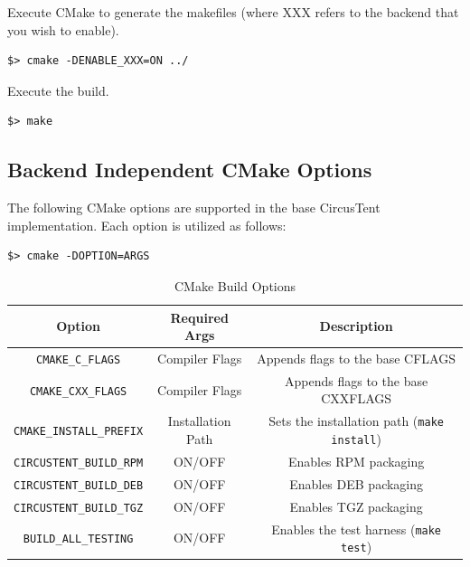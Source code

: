 \documentclass{article}
\begin{document}
Execute CMake to generate the makefiles (where XXX refers 
to the backend that you wish to enable).
\begin{verbatim}
$> cmake -DENABLE_XXX=ON ../
\end{verbatim}

Execute the build.
\begin{verbatim}
$> make
\end{verbatim}

\clearpage
\subsection{Backend Independent CMake Options}
\label{sec:CMakeOptions}

The following CMake options are supported in the base CircusTent 
implementation.  Each option is utilized as follows: 

\begin{verbatim}
$> cmake -DOPTION=ARGS
\end{verbatim}

\begin{table}[!h]
\renewcommand{\arraystretch}{1.3}
\caption{CMake Build Options}
\label{tab:cmakeoptions}
\centering
\begin{tabular}{c|c|c}
\hline
\textbf{Option} & \textbf{Required Args} & \textbf{Description}\\
\hline
\texttt{CMAKE\_C\_FLAGS} & Compiler Flags & Appends flags to the base CFLAGS\\
\hline
\texttt{CMAKE\_CXX\_FLAGS} & Compiler Flags & Appends flags to the base CXXFLAGS\\
\hline
\texttt{CMAKE\_INSTALL\_PREFIX} & Installation Path & Sets the installation path (\texttt{make install})\\
\hline
\texttt{CIRCUSTENT\_BUILD\_RPM} & ON/OFF & Enables RPM packaging\\
\hline
\texttt{CIRCUSTENT\_BUILD\_DEB} & ON/OFF &  Enables DEB packaging\\
\hline
\texttt{CIRCUSTENT\_BUILD\_TGZ} & ON/OFF & Enables TGZ packaging\\
\hline
\texttt{BUILD\_ALL\_TESTING} & ON/OFF & Enables the test harness (\texttt{make test})\\
\hline
\end{tabular}
\end{table}

\clearpage
\end{document}
